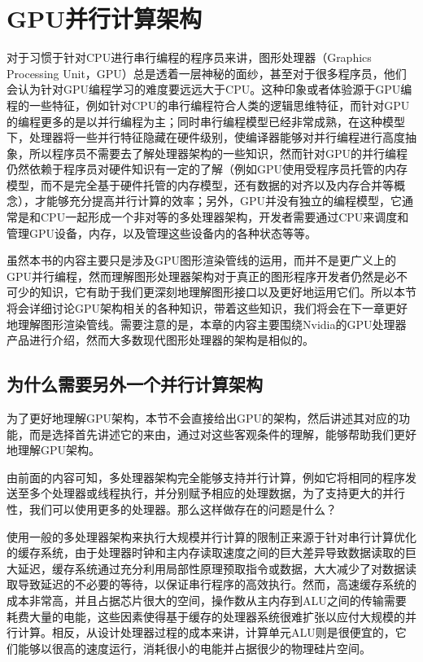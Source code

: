 \section{GPU并行计算架构}
对于习惯于针对CPU进行串行编程的程序员来讲，图形处理器（Graphics Processing Unit，GPU）总是透着一层神秘的面纱，甚至对于很多程序员，他们会认为针对GPU编程学习的难度要远远大于CPU。这种印象或者体验源于GPU编程的一些特征，例如针对CPU的串行编程符合人类的逻辑思维特征，而针对GPU的编程更多的是以并行编程为主；同时串行编程模型已经非常成熟，在这种模型下，处理器将一些并行特征隐藏在硬件级别，使编译器能够对并行编程进行高度抽象，所以程序员不需要去了解处理器架构的一些知识，然而针对GPU的并行编程仍然依赖于程序员对硬件知识有一定的了解（例如GPU使用受程序员托管的内存模型，而不是完全基于硬件托管的内存模型，还有数据的对齐以及内存合并等概念），才能够充分提高并行计算的效率；另外，GPU并没有独立的编程模型，它通常是和CPU一起形成一个非对等的多处理器架构，开发者需要通过CPU来调度和管理GPU设备，内存，以及管理这些设备内的各种状态等等。

虽然本书的内容主要只是涉及GPU图形渲染管线的运用，而并不是更广义上的GPU并行编程，然而理解图形处理器架构对于真正的图形程序开发者仍然是必不可少的知识，它有助于我们更深刻地理解图形接口以及更好地运用它们。所以本节将会详细讨论GPU架构相关的各种知识，带着这些知识，我们将会在下一章更好地理解图形渲染管线。需要注意的是，本章的内容主要围绕Nvidia的GPU处理器产品进行介绍，然而大多数现代图形处理器的架构是相似的。




\subsection{为什么需要另外一个并行计算架构}
为了更好地理解GPU架构，本节不会直接给出GPU的架构，然后讲述其对应的功能，而是选择首先讲述它的来由，通过对这些客观条件的理解，能够帮助我们更好地理解GPU架构。

由前面的内容可知，多处理器架构完全能够支持并行计算，例如它将相同的程序发送至多个处理器或线程执行，并分别赋予相应的处理数据，为了支持更大的并行性，我们可以使用更多的处理器。那么这样做存在的问题是什么？

使用一般的多处理器架构来执行大规模并行计算的限制正来源于针对串行计算优化的缓存系统，由于处理器时钟和主内存读取速度之间的巨大差异导致数据读取的巨大延迟，缓存系统通过充分利用局部性原理预取指令或数据，大大减少了对数据读取导致延迟的不必要的等待，以保证串行程序的高效执行。然而，高速缓存系统的成本非常高，并且占据芯片很大的空间，操作数从主内存到ALU之间的传输需要耗费大量的电能，这些因素使得基于缓存的处理器系统很难扩张以应付大规模的并行计算。相反，从设计处理器过程的成本来讲，计算单元ALU则是很便宜的，它们能够以很高的速度运行，消耗很小的电能并占据很少的物理硅片空间。

